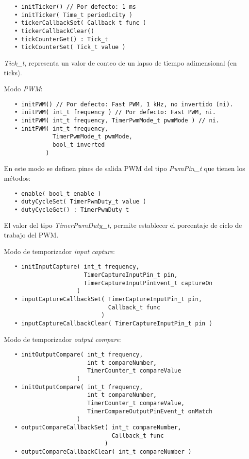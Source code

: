\begin{verbatim}
   • initTicker() // Por defecto: 1 ms
   • initTicker( Time_t periodicity )
   • tickerCallbackSet( Callback_t func )
   • tickerCallbackClear()
   • tickCounterGet() : Tick_t
   • tickCounterSet( Tick_t value )
\end{verbatim}

\emph{Tick\_t}, representa un valor de conteo de un lapso de tiempo adimensional (en ticks).

Modo \emph{PWM}:

\begin{verbatim}
   • initPWM() // Por defecto: Fast PWM, 1 kHz, no invertido (ni).
   • initPWM( int_t frequency ) // Por defecto: Fast PWM, ni.
   • initPWM( int_t frequency, TimerPwmMode_t pwmMode ) // ni.
   • initPWM( int_t frequency, 
              TimerPwmMode_t pwmMode, 
              bool_t inverted 
            )
\end{verbatim}

En este modo se definen pines de salida PWM del tipo \emph{PwmPin\_t} que tienen los métodos:

\begin{verbatim}
   • enable( bool_t enable )
   • dutyCycleSet( TimerPwmDuty_t value )
   • dutyCycleGet() : TimerPwmDuty_t
\end{verbatim}

El valor del tipo \emph{TimerPwmDuty\_t}, permite establecer el porcentaje de ciclo de trabajo del PWM.

Modo de temporizador \emph{input capture}:

\begin{verbatim}
   • initInputCapture( int_t frequency, 
                       TimerCaptureInputPin_t pin,
                       TimerCaptureInputPinEvent_t captureOn
                     )
   • inputCaptureCallbackSet( TimerCaptureInputPin_t pin,
                              Callback_t func 
                            )
   • inputCaptureCallbackClear( TimerCaptureInputPin_t pin )
\end{verbatim}

Modo de temporizador \emph{output compare}:

\begin{verbatim}
   • initOutputCompare( int_t frequency,
                        int_t compareNumber,
                        TimerCounter_t compareValue
                     )
   • initOutputCompare( int_t frequency,
                        int_t compareNumber,
                        TimerCounter_t compareValue,
                        TimerCompareOutputPinEvent_t onMatch
                     )
   • outputCompareCallbackSet( int_t compareNumber,
   							   Callback_t func
                             )
   • outputCompareCallbackClear( int_t compareNumber )
\end{verbatim}


